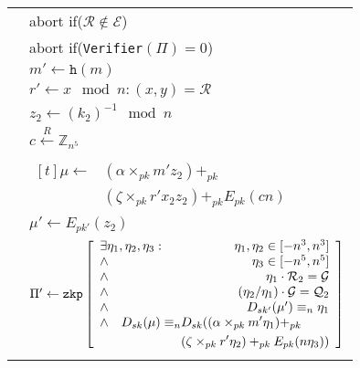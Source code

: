 \begin{figure}[H]
\begin{table}[H]
\begin{footnotesize}
{\begin{tabular}{ | l l | }
          & abort if($\mathcal{R} \notin \mathcal{E}$) \\
          & abort if(\texttt{Verifier}$(\Pi) = 0$) \\
          & $m' \leftarrow \texttt{h}(m)$ \\
          & $r' \leftarrow x \mod n : (x,y) = \mathcal{R}$ \\
          & $z_2 \leftarrow (k_2)^{-1} \mod n$ \\
          & $c \xleftarrow[]{R} \mathbb{Z}_{n^5}$ \\
          & $\begin{aligned}[t]
              \mu \leftarrow & (\alpha \times_{pk} m'z_2) +_{pk} \\
                             & (\zeta \times_{pk} r'x_2z_2) +_{pk} E_{pk}(cn)
            \end{aligned}$ \\
          & $\mu' \leftarrow E_{pk'}(z_2)$ \\
          & {$\Pi' \leftarrow \texttt{zkp} \begin{bmatrix}\begin{array}{lr}
                                            \exists \eta_1, \eta_2, \eta_3 : & \eta_1, \eta_2 \in [-n^3, n^3] \\
                                            \land & \eta_3 \in [-n^5, n^5] \\
                                            \land & \eta_1 \cdot \mathcal{R}_2 = \mathcal{G} \\
                                            \land & (\eta_2/\eta_1) \cdot \mathcal{G} = \mathcal{Q}_2 \\
                                            \land & D_{sk'}(\mu') \equiv_n \eta_1 \\
                                            \multicolumn{2}{l}{
                                              \begin{aligned}[t]
                                                  \land \quad D_{sk}(\mu) \equiv_n & D_{sk}((\alpha \times_{pk} m'\eta_1) +_{pk} \\
                                                                                   & (\zeta \times_{pk} r'\eta_2) +_{pk} E_{pk}(n\eta_3))
                                                \end{aligned}
                                            }
                                           \end{array}\end{bmatrix}$} \\ & \\

\end{tabular}}
\end{footnotesize}
\end{table}
\end{figure}
